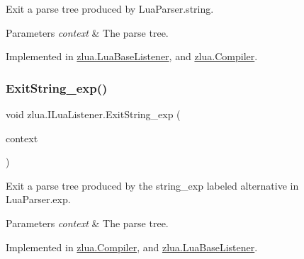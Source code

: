 Exit a parse tree produced by Lua\+Parser.\+string. 


\begin{DoxyParams}{Parameters}
{\em context} & The parse tree.\\
\hline
\end{DoxyParams}


Implemented in \mbox{\hyperlink{classzlua_1_1_lua_base_listener_ac80dc12b34aee654e56ecc7e37a77ac7}{zlua.\+Lua\+Base\+Listener}}, and \mbox{\hyperlink{classzlua_1_1_compiler_ac491501f1dcb06e396453c15c20fa5b8}{zlua.\+Compiler}}.

\mbox{\label{interfacezlua_1_1_i_lua_listener_adaa28943f1961d32164acc489c86f308}} 
\subsubsection{\texorpdfstring{Exit\+String\+\_\+exp()}{ExitString\_exp()}}
{\footnotesize\ttfamily void zlua.\+I\+Lua\+Listener.\+Exit\+String\+\_\+exp (\begin{DoxyParamCaption}\item[{\mbox{[}\+Not\+Null\mbox{]} \mbox{\hyperlink{classzlua_1_1_lua_parser_1_1_string__exp_context}{Lua\+Parser.\+String\+\_\+exp\+Context}}}]{context }\end{DoxyParamCaption})}



Exit a parse tree produced by the {\ttfamily string\+\_\+exp} labeled alternative in Lua\+Parser.\+exp. 


\begin{DoxyParams}{Parameters}
{\em context} & The parse tree.\\
\hline
\end{DoxyParams}


Implemented in \mbox{\hyperlink{classzlua_1_1_compiler_aa552695cd135ecaed2b17482560dd97d}{zlua.\+Compiler}}, and \mbox{\hyperlink{classzlua_1_1_lua_base_listener_ac4f5a6a5139a8c670bb8f075a8fc3782}{zlua.\+Lua\+Base\+Listener}}.

\mbox{\label{interfacezlua_1_1_i_lua_listener_a30a4acd429120b15838dc24ddb201fc6}} 
